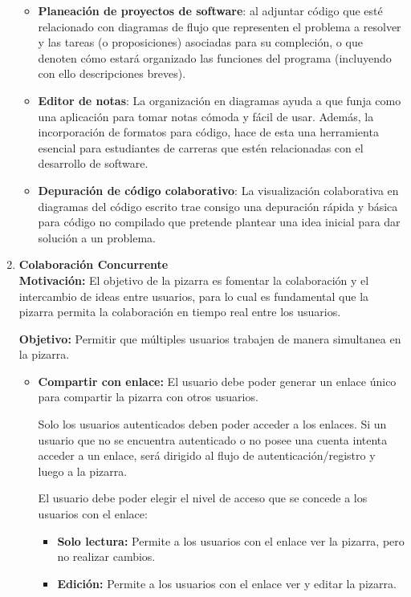 \documentclass[a4paper, oneside, final]{scrartcl}
\begin{document}
\begin{enumerate}
  \begin{itemize}
  \item \textbf{Planeación de proyectos de software}: al adjuntar código que esté
    relacionado con diagramas de flujo que representen el problema a resolver y las
    tareas (o proposiciones) asociadas para su compleción, o que denoten cómo estará
    organizado las funciones del programa (incluyendo con ello descripciones
    breves).
  \item \textbf{Editor de notas}: La organización en diagramas ayuda a que funja como una
    aplicación para tomar notas cómoda y fácil de usar. Además, la incorporación de
    formatos para código, hace de esta una herramienta esencial para estudiantes
    de carreras que estén relacionadas con el desarrollo de software.
  \item \textbf{Depuración de código colaborativo}: La visualización colaborativa en
    diagramas del código escrito trae consigo una depuración rápida y básica para
    código no compilado que pretende plantear una idea inicial para dar solución
    a un problema.
  \end{itemize}

  \clearpage
\item \textbf{Colaboración Concurrente}\\ %
  \textbf{Motivación:} El objetivo de la pizarra es fomentar la colaboración y el intercambio de ideas entre usuarios, para lo
  cual es fundamental que la pizarra permita la colaboración en tiempo real entre los usuarios.

  \textbf{Objetivo:} Permitir que múltiples usuarios trabajen de manera simultanea en la pizarra.
  \begin{itemize}
  \item \textbf{Compartir con enlace:} El usuario debe poder generar un enlace único para compartir la pizarra con otros usuarios.

    Solo los usuarios autenticados deben poder acceder a los enlaces. Si un usuario que no se encuentra autenticado o no posee una cuenta intenta acceder a un enlace, será dirigido al flujo de autenticación/registro y luego a la pizarra.

    El usuario debe poder elegir el nivel de acceso que se concede a los usuarios con el enlace:
    \begin{itemize}
    \item \textbf{Solo lectura:} Permite a los usuarios con el enlace ver la pizarra, pero no realizar cambios.
    \item \textbf{Edición:} Permite a los usuarios con el enlace ver y editar la pizarra.
    \end{itemize}


\end{itemize}
\end{enumerate}
\end{document}
